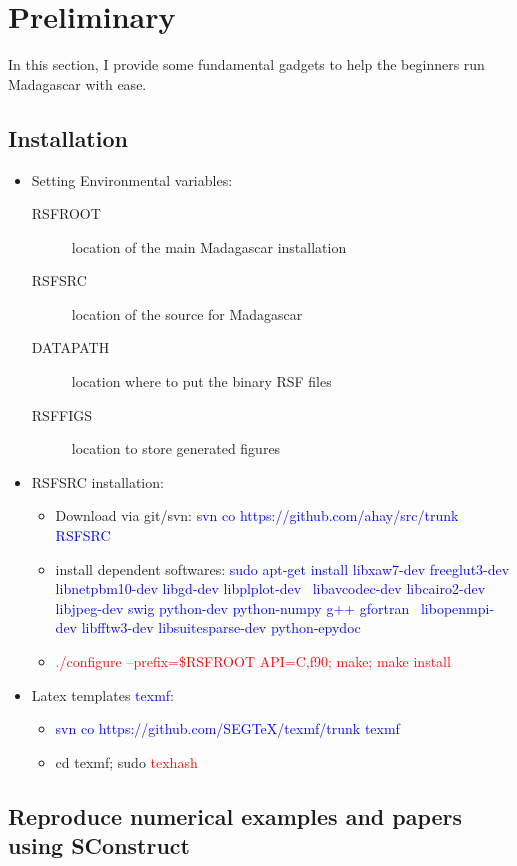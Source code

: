 \section{Preliminary}

In this section, I provide some fundamental gadgets to help the beginners run Madagascar with ease.

\subsection{Installation}

\begin{itemize}
 \item Setting Environmental variables:
 \begin{description}
  \item[RSFROOT] 	location of the main Madagascar installation
  \item[RSFSRC] 	location of the source for Madagascar
  \item[DATAPATH] 	location where to put the binary RSF files 
  \item[RSFFIGS]	location to store generated figures
 \end{description}
 \item RSFSRC installation: 
 \begin{itemize}
  \item Download via git/svn:  \textcolor{blue}{svn co https://github.com/ahay/src/trunk RSFSRC}
  \item install dependent softwares: \textcolor{blue}{sudo apt-get install libxaw7-dev freeglut3-dev libnetpbm10-dev libgd-dev libplplot-dev \
	  libavcodec-dev libcairo2-dev libjpeg-dev swig python-dev python-numpy g++ gfortran \
	  libopenmpi-dev libfftw3-dev libsuitesparse-dev python-epydoc}
  \item \textcolor{red}{./configure --prefix=\$RSFROOT API=C,f90; make; make install}
 \end{itemize}
 \item Latex templates \textcolor{blue}{texmf}:
 \begin{itemize}
  \item \textcolor{blue}{svn co https://github.com/SEGTeX/texmf/trunk texmf}
  \item cd texmf; sudo \textcolor{red}{texhash}
  \end{itemize}
\end{itemize}


\subsection{Reproduce numerical examples and papers using SConstruct}

